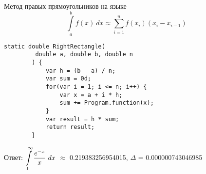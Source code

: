 \def \itemtitle {Метод правых прямоугольников на языке \textit \Csh}

\item 
	\itemtitle
	\[ \displaystyle \int \limits_{a}^{b} {f(x) ~ dx} 
	\approx \sum\limits_{i=1}^{n} f(x_i)(x_{i} - {x}_{i-1}) \]
	\begin{lstlisting}[caption=\itemtitle]
		static double RightRectangle(
		 double a, double b, double n
		) {
			var h = (b - a) / n;
			var sum = 0d;
			for(var i = 1; i <= n; i++) {
				var x = a + i * h;
				sum += Program.function(x);
			}
			var result = h * sum;
			return result;
		}
	\end{lstlisting}
	Ответ: $\displaystyle \int\limits_1^{\infty} {\frac{ e^{-x} }{ x } ~ dx}$ $\approx$ 0.219383256954015, $\Delta$ = 0.000000743046985
